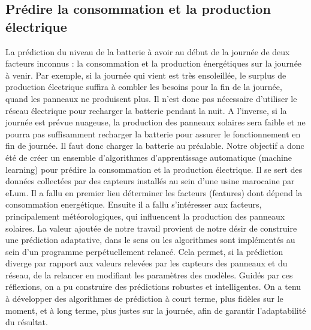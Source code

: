 \documentclass[a4paper]{article}
\begin{document}
\begin{multicols}{2}
\subsection{Prédire la consommation et la production électrique}
La prédiction du niveau de la batterie à avoir au début de la journée de deux facteurs inconnus : la consommation et la production énergétiques sur la journée à venir.
Par exemple, si la journée qui vient est très ensoleillée, le surplus de production électrique suffira à combler les besoins pour la fin de la journée, quand les panneaux ne produisent plus. Il n’est donc pas nécessaire d’utiliser le réseau électrique pour recharger la batterie pendant la nuit. A l’inverse, si la journée est prévue nuageuse, la production des panneaux solaires sera faible et ne pourra pas suffisamment recharger la batterie pour assurer le fonctionnement en fin de journée. Il faut donc charger la batterie au préalable.
Notre objectif a donc été de créer un ensemble d’algorithmes d’apprentissage automatique (machine learning) pour prédire la consommation et la production électrique. Il se sert des données collectées par des capteurs installés au sein d’une usine marocaine par eLum. Il a fallu en premier lieu déterminer les facteurs (features) dont dépend la consommation energétique. Ensuite il a fallu s’intéresser aux facteurs, principalement météorologiques, qui influencent la production des panneaux solaires.
La valeur ajoutée de notre travail provient de notre désir de construire une prédiction adaptative, dans le sens ou les algorithmes sont implémentés au sein d'un programme perpétuellement relancé. Cela permet, si la prédiction diverge par rapport aux valeurs relevées par les capteurs des panneaux et du réseau, de la relancer en modifiant les paramètres des modèles.
Guidés par ces réflexions, on a pu construire des prédictions robustes et intelligentes. On a tenu à développer des algorithmes de prédiction à court terme, plus fidèles sur le moment, et à long terme, plus justes sur la journée, afin de garantir l'adaptabilité du résultat.


\end{multicols}

\clearpage

\end{document}
